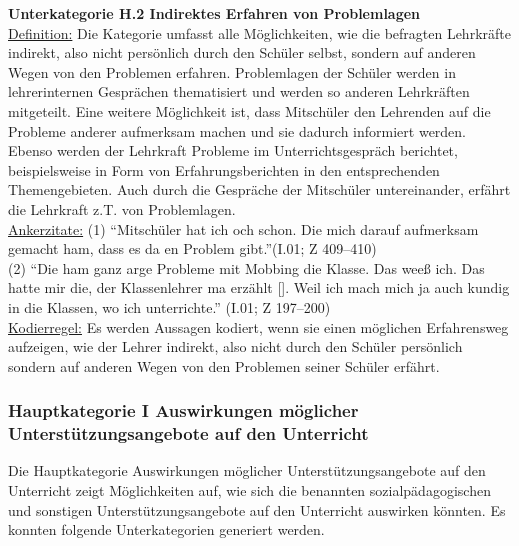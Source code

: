 \noindent
\textbf{Unterkategorie H.2 Indirektes Erfahren von Problemlagen}\\
\underline{Definition:} Die Kategorie umfasst alle Möglichkeiten, wie die befragten Lehrkräfte indirekt, also nicht persönlich durch den Schüler selbst, sondern auf anderen Wegen von den Problemen erfahren. Problemlagen der Schüler werden in lehrerinternen Gesprächen thematisiert und werden so anderen Lehrkräften mitgeteilt. Eine weitere Möglichkeit ist, dass Mitschüler den Lehrenden auf die Probleme anderer aufmerksam machen und sie dadurch informiert werden. Ebenso werden der Lehrkraft Probleme im Unterrichtsgespräch berichtet, beispielsweise in Form von Erfahrungsberichten in den entsprechenden Themengebieten. Auch durch die Gespräche der Mitschüler untereinander, erfährt die Lehrkraft z.T. von Problemlagen.\\
\underline{Ankerzitate:} (1) "`Mitschüler hat ich och schon. Die mich darauf aufmerksam gemacht ham, dass es da en Problem gibt."'(I.01; Z 409--410)\\ (2) "`Die ham ganz arge Probleme mit Mobbing die Klasse. Das weeß ich. Das hatte mir die, der Klassenlehrer ma erzählt [\punkte]. Weil ich mach mich ja auch kundig in die Klassen, wo ich unterrichte."' (I.01; Z 197--200)\\
\underline{Kodierregel:} Es werden Aussagen kodiert, wenn sie einen möglichen Erfahrensweg aufzeigen, wie der Lehrer indirekt, also nicht durch den Schüler persönlich sondern auf anderen Wegen von den Problemen seiner Schüler erfährt.

\subsubsection{Hauptkategorie I Auswirkungen möglicher Unterstützungsangebote auf den Unterricht}
\label{sec:HauptkategorieIAuswirkungenMöglicherUnterstützungsangeboteAufDenUnterricht}

Die Hauptkategorie Auswirkungen möglicher Unterstützungsangebote auf den Unterricht zeigt Möglichkeiten auf, wie sich die benannten sozialpädagogischen und sonstigen Unterstützungsangebote auf den Unterricht auswirken könnten. Es konnten folgende Unterkategorien generiert werden.\\

